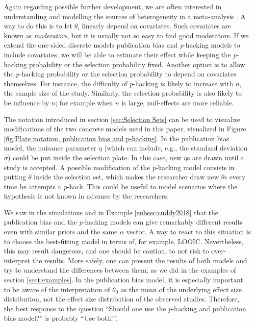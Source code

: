 \documentclass{article}
\theoremstyle{plain}
\theoremstyle{definition}
\begin{document}
Again regarding possible further development, we are often interested in understanding and modelling the sources of heterogeneity in a meta-analysis \citep{thompson1994systematic}. A way to do this is to let $\theta_{i}$ linearly depend on covariates. Such covariates are known as \emph{moderators}, but it is usually not so easy to find good moderators. If we extend the one-sided discrete models publication bias and \textit{p}-hacking models to include covariates, we will be able to estimate their effect while keeping the \textit{p}-hacking probability or the selection probability fixed. Another option is to allow the \textit{p}-hacking probability or the selection probability to depend on covariates themselves. For instance, the difficulty of \textit{p}-hacking is likely to increase with $n$, the sample size of the study. Similarly, the selection probability is also likely to be influence by $n$; for example when $n$ is large, null-effects are more reliable.

The notation introduced in section \ref{sec:Selection Sets} can be used to visualize modifications of the two concrete models used in this paper, visualized in Figure \ref{fig:Plate notation, publication bias and p-hacking}. In the publication bias model, the nuisance parameter $\eta$ (which can include, e.g., the standard deviation $\sigma$) could be put inside the selection plate. In this case, new $\eta$s are drawn until a study is accepted. A possible modification of the \textit{p}-hacking model consists in putting $\theta$ inside the selection set, which makes the researcher draw new $\theta$s every time he attempts a \textit{p}-hack. This could be useful to model scenarios where the hypothesis is not
known in advance by the researchers.

We saw in the simulations and in Example \ref{subsec:cuddy2018} that the publication bias and the \textit{p}-hacking models can give remarkably different results even with similar priors and the same $\alpha$ vector. A way to react to this situation is to choose the best-fitting model in terms of, for example, LOOIC. Nevertheless, this may result dangerous, and one should be caution, to not risk to over-interpret the results. More safely, one can present the results of both models and try to understand the differences between them, as we did in the examples of section \ref{sect:examples}. In the publication bias model, it is especially important to be aware of the interpretation of $\theta_{0}$ as the mean of the underlying effect size distribution, not the effect size distribution of the observed studies. Therefore, the best response to the question ``Should one use the \textit{p}-hacking and publication bias model?'' is probably ``Use both!''.
\end{document}
